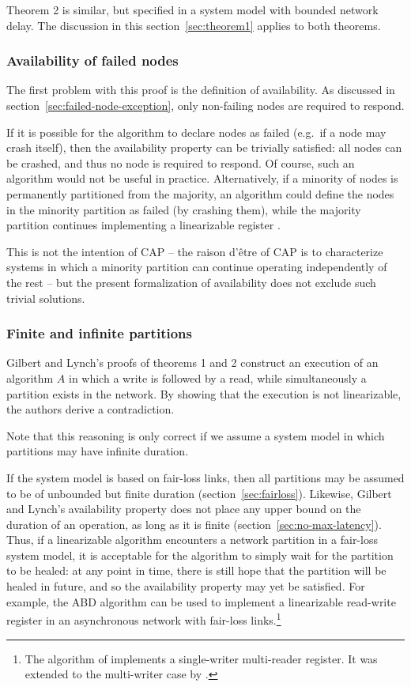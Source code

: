 \documentclass[fleqn,12pt,lineno]{wlpeerj} %
\begin{document}
Theorem 2 is similar, but specified in a system model with bounded network delay. The discussion in
this section~\ref{sec:theorem1} applies to both theorems.

\subsubsection{Availability of failed nodes}\label{sec:failed-node-trivial}

The first problem with this proof is the definition of availability. As discussed in
section~\ref{sec:failed-node-exception}, only non-failing nodes are required to respond.

If it is possible for the algorithm to declare nodes as failed (e.g.\ if a node may crash itself),
then the availability property can be trivially satisfied: all nodes can be crashed, and thus no
node is required to respond. Of course, such an algorithm would not be useful in practice.
Alternatively, if a minority of nodes is permanently partitioned from the majority, an algorithm
could define the nodes in the minority partition as failed (by crashing them), while the majority
partition continues implementing a linearizable register \citep{Attiya1995bm}.

This is not the intention of CAP -- the raison d'\^{e}tre of CAP is to characterize systems in which
a minority partition can continue operating independently of the rest -- but the present
formalization of availability does not exclude such trivial solutions.

\subsubsection{Finite and infinite partitions}

Gilbert and Lynch's proofs of theorems 1 and 2 construct an execution of an algorithm $A$ in which a
write is followed by a read, while simultaneously a partition exists in the network. By showing that
the execution is not linearizable, the authors derive a contradiction.

Note that this reasoning is only correct if we assume a system model in which partitions may have
infinite duration.

If the system model is based on fair-loss links, then all partitions may be assumed to be of
unbounded but finite duration (section~\ref{sec:fairloss}). Likewise, Gilbert and Lynch's
availability property does not place any upper bound on the duration of an operation, as long as it
is finite (section~\ref{sec:no-max-latency}). Thus, if a linearizable algorithm encounters a
network partition in a fair-loss system model, it is acceptable for the algorithm to simply wait for
the partition to be healed: at any point in time, there is still hope that the partition will be
healed in future, and so the availability property may yet be satisfied. For example, the ABD
algorithm \citep{Attiya1995bm} can be used to implement a linearizable read-write register in an
asynchronous network with fair-loss links.\footnote{The algorithm of \citet{Attiya1995bm} implements
a single-writer multi-reader register. It was extended to the multi-writer case by \citet{Lynch1997gr}.}
\end{document}
